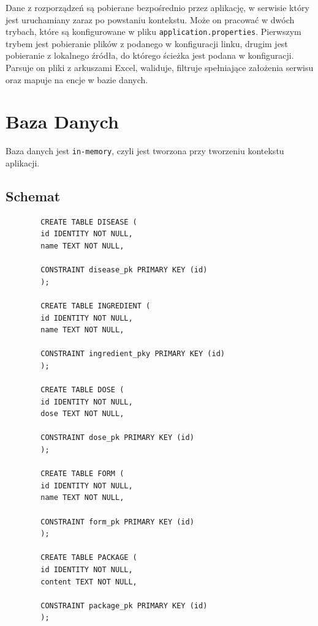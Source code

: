 \documentclass{article}
\begin{document}
    Dane z rozporządzeń są pobierane bezpośrednio przez aplikację, w serwisie który jest uruchamiany zaraz po powstaniu kontekstu.
    Może on pracować w dwóch trybach, które są konfigurowane w pliku \texttt{application.properties}.
    Pierwszym trybem jest pobieranie plików z podanego w konfiguracji linku,
    drugim jest pobieranie z lokalnego źródła, do którego ścieżka jest podana w konfiguracji.
    Parsuje on pliki z arkuszami Excel, waliduje, filtruje spełniające założenia serwisu oraz mapuje na encje w bazie danych.
  \section{Baza Danych}
  Baza danych jest \texttt{in-memory}, czyli jest tworzona przy tworzeniu kontekstu aplikacji.

  \subsection{Schemat}
    \noindent
    \begin{minipage}{.45\textwidth}
      \begin{lstlisting}
        CREATE TABLE DISEASE (
        id IDENTITY NOT NULL,
        name TEXT NOT NULL,

        CONSTRAINT disease_pk PRIMARY KEY (id)
        );

        CREATE TABLE INGREDIENT (
        id IDENTITY NOT NULL,
        name TEXT NOT NULL,

        CONSTRAINT ingredient_pky PRIMARY KEY (id)
        );

        CREATE TABLE DOSE (
        id IDENTITY NOT NULL,
        dose TEXT NOT NULL,

        CONSTRAINT dose_pk PRIMARY KEY (id)
        );

        CREATE TABLE FORM (
        id IDENTITY NOT NULL,
        name TEXT NOT NULL,

        CONSTRAINT form_pk PRIMARY KEY (id)
        );

        CREATE TABLE PACKAGE (
        id IDENTITY NOT NULL,
        content TEXT NOT NULL,

        CONSTRAINT package_pk PRIMARY KEY (id)
        );
      \end{lstlisting}
    \end{minipage}\hfill
\end{document}

